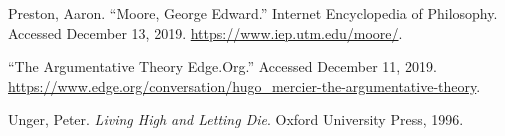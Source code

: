\documentclass[12pt, openany]{book}
\begin{document}
\leavevmode\hypertarget{ref-prestonMooreGeorgeEdward}{}%
Preston, Aaron. ``Moore, George Edward.'' Internet Encyclopedia of Philosophy. Accessed December 13, 2019. \url{https://www.iep.utm.edu/moore/}.

\leavevmode\hypertarget{ref-ArgumentativeTheoryEdge}{}%
``The Argumentative Theory \textbar{} Edge.Org.'' Accessed December 11, 2019. \url{https://www.edge.org/conversation/hugo_mercier-the-argumentative-theory}.

\leavevmode\hypertarget{ref-ungerLivingHighLetting1996}{}%
Unger, Peter. \emph{Living High and Letting Die}. Oxford University Press, 1996.
\end{document}
